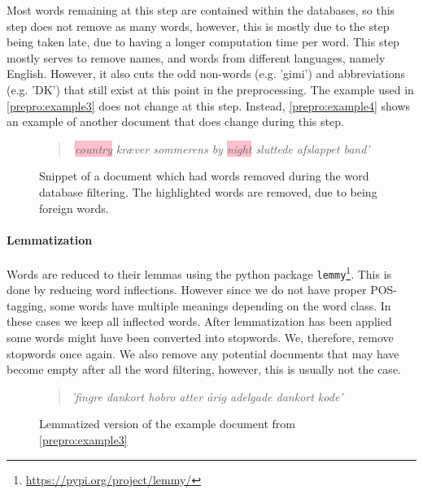 Most words remaining at this step are contained within the databases, so this step does not remove as many words, however, this is mostly due to the step being taken late, due to having a longer computation time per word.
This step mostly serves to remove names, and words from different languages, namely English.
However, it also cuts the odd non-words (e.g. 'gimi') and abbreviations (e.g. 'DK') that still exist at this point in the preprocessing.
The example used in \autoref{prepro:example3} does not change at this step. 
Instead, \autoref{prepro:example4} shows an example of another document that does change during this step.

\begin{figure}[h]
	\begin{framed}
		\begin{quote}
			\textit{
				'\colorbox{pink}{country} kræver sommerens by \colorbox{pink}{night} sluttede afslappet band'
			}
		\end{quote}
	\end{framed}
	\caption{Snippet of a document which had words removed during the word database filtering. The highlighted words are removed, due to being foreign words.}
	\label{prepro:example4}
\end{figure}

\paragraph{Lemmatization}
Words are reduced to their lemmas using the python package \texttt{lemmy}\footnote{\url{https://pypi.org/project/lemmy/}}. 
This is done by reducing word inflections.
However since we do not have proper POS-tagging, some words have multiple meanings depending on the word class.
In these cases we keep all inflected words.
After lemmatization has been applied some words might have been converted into stopwords.
We, therefore, remove stopwords once again.
We also remove any potential documents that may have become empty after all the word filtering, however, this is usually not the case.
\begin{figure}[h]
	\begin{framed}
		\begin{quote}
			\textit{
				'fingre dankort hobro atter årig adelgade dankort kode'
			}
		\end{quote}
	\end{framed}
	\caption{Lemmatized version of the example document from \autoref{prepro:example3}}
	\label{prepro:example5}
\end{figure}

